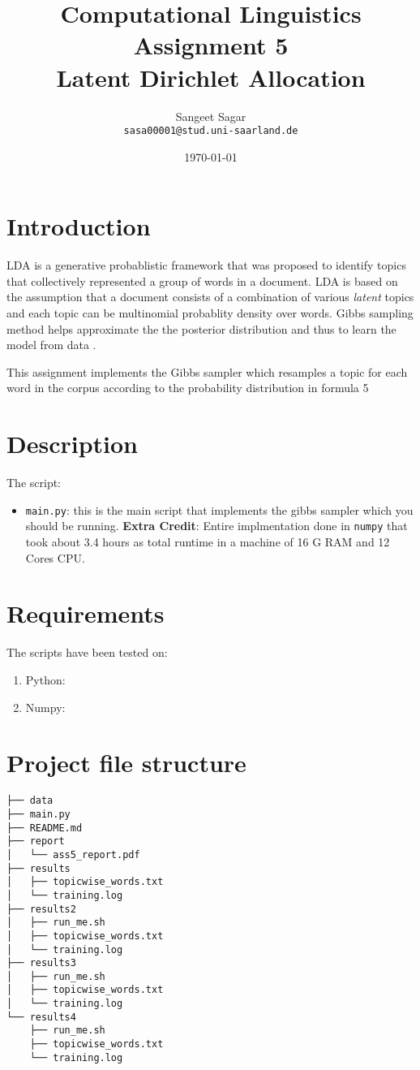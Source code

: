 \documentclass{article}[a4paper]
\title{\textbf{Computational Linguistics} \\
Assignment 5\\
Latent Dirichlet Allocation 
}
\author{Sangeet Sagar\\
            \texttt{sasa00001@stud.uni-saarland.de}
}
\date{\today}
\begin{document}
\maketitle
\section{Introduction}
LDA is a generative probablistic framework that was proposed to identify topics that collectively represented a group of words in a document. LDA is based on the assumption that a document consists of a combination of various \textit{latent} topics and each topic can be multinomial probablity density over words. Gibbs sampling method helps approximate the the posterior distribution and thus to learn the model from data \citep{Darling2011}.

This assignment implements the Gibbs sampler which resamples a topic for each word in the corpus according to the probability distribution in formula 5 \citep{Griffiths5228}

\section{Description}
The script:
\begin{itemize}
    \item \texttt{main.py}: this is the main script that implements the gibbs sampler  which you should be running. \textbf{Extra Credit}: Entire implmentation done in \texttt{numpy} that took about 3.4 hours as total runtime in a machine of 16 G RAM and 12 Cores CPU.
\end{itemize}

\section{Requirements}
The scripts have been tested on:
\begin{enumerate}
    \item Python: 
    \item Numpy: 
\end{enumerate}

\section{Project file structure}
\begin{Verbatim}
├── data
├── main.py
├── README.md
├── report
│   └── ass5_report.pdf
├── results
│   ├── topicwise_words.txt
│   └── training.log
├── results2
│   ├── run_me.sh
│   ├── topicwise_words.txt
│   └── training.log
├── results3
│   ├── run_me.sh
│   ├── topicwise_words.txt
│   └── training.log
└── results4
    ├── run_me.sh
    ├── topicwise_words.txt
    └── training.log

 \end{Verbatim}
\end{document}
